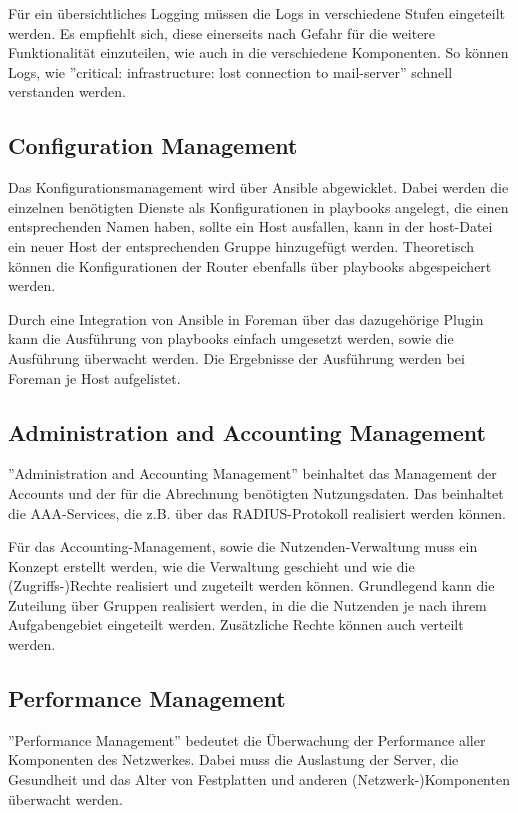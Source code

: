 Für ein übersichtliches Logging müssen die Logs in verschiedene Stufen eingeteilt werden. Es empfiehlt sich, diese einerseits nach Gefahr für die weitere Funktionalität einzuteilen, wie auch in die verschiedene Komponenten. So können Logs, wie ''critical: infrastructure: lost connection to mail-server'' schnell verstanden werden.

\subsection{Configuration Management}
Das Konfigurationsmanagement wird über Ansible abgewicklet. Dabei werden die einzelnen benötigten Dienste als Konfigurationen in playbooks angelegt, die einen entsprechenden Namen haben, sollte ein Host ausfallen, kann in der host-Datei ein neuer Host der entsprechenden Gruppe hinzugefügt werden. Theoretisch können die Konfigurationen der Router ebenfalls über playbooks abgespeichert werden. 

Durch eine Integration von Ansible in Foreman über das dazugehörige Plugin kann die Ausführung von playbooks einfach umgesetzt werden, sowie die Ausführung überwacht werden. Die Ergebnisse der Ausführung werden bei Foreman je Host aufgelistet.

\subsection{Administration and Accounting Management}
''Administration and Accounting Management'' beinhaltet das Management der Accounts und der für die Abrechnung benötigten Nutzungsdaten. Das beinhaltet die AAA-Services, die z.B. über das RADIUS-Protokoll realisiert werden können. 

Für das Accounting-Management, sowie die Nutzenden-Verwaltung muss ein Konzept erstellt werden, wie die Verwaltung geschieht und wie die (Zugriffs-)Rechte realisiert und zugeteilt werden können. Grundlegend kann die Zuteilung über Gruppen realisiert werden, in die die Nutzenden je nach ihrem Aufgabengebiet eingeteilt werden. Zusätzliche Rechte können auch verteilt werden.

\subsection{Performance Management}
''Performance Management'' bedeutet die Überwachung der Performance aller Komponenten des Netzwerkes. Dabei muss die Auslastung der Server, die Gesundheit und das Alter von Festplatten und anderen (Netzwerk-)Komponenten überwacht werden.

